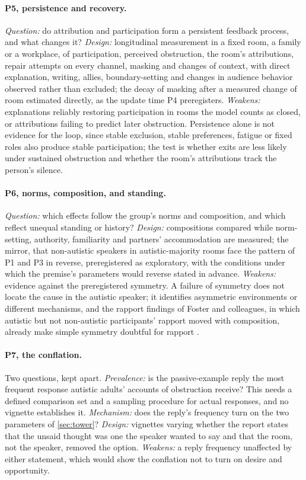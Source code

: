 \paragraph{P5, persistence and recovery.} \emph{Question:} do attribution and participation form a persistent feedback process, and what changes it? \emph{Design:} longitudinal measurement in a fixed room, a family or a workplace, of participation, perceived obstruction, the room's attributions, repair attempts on every channel, masking and changes of context, with direct explanation, writing, allies, boundary-setting and changes in audience behavior observed rather than excluded; the decay of masking after a measured change of room estimated directly, as the update time P4 preregisters. \emph{Weakens:} explanations reliably restoring participation in rooms the model counts as closed, or attributions failing to predict later obstruction. Persistence alone is not evidence for the loop, since stable exclusion, stable preferences, fatigue or fixed roles also produce stable participation; the test is whether exits are less likely under sustained obstruction and whether the room's attributions track the person's silence.

\paragraph{P6, norms, composition, and standing.} \emph{Question:} which effects follow the group's norms and composition, and which reflect unequal standing or history? \emph{Design:} compositions compared while norm-setting, authority, familiarity and partners' accommodation are measured; the mirror, that non-autistic speakers in autistic-majority rooms face the pattern of P1 and P3 in reverse, preregistered as exploratory, with the conditions under which the premise's parameters would reverse stated in advance. \emph{Weakens:} evidence against the preregistered symmetry. A failure of symmetry does not locate the cause in the autistic speaker; it identifies asymmetric environments or different mechanisms, and the rapport findings of Foster and colleagues, in which autistic but not non-autistic participants' rapport moved with composition, already make simple symmetry doubtful for rapport \cite{Foster2025}.

\paragraph{P7, the conflation.} Two questions, kept apart. \emph{Prevalence:} is the passive-example reply the most frequent response autistic adults' accounts of obstruction receive? This needs a defined comparison set and a sampling procedure for actual responses, and no vignette establishes it. \emph{Mechanism:} does the reply's frequency turn on the two parameters of \autoref{sec:tower}? \emph{Design:} vignettes varying whether the report states that the unsaid thought was one the speaker wanted to say and that the room, not the speaker, removed the option. \emph{Weakens:} a reply frequency unaffected by either statement, which would show the conflation not to turn on desire and opportunity.

